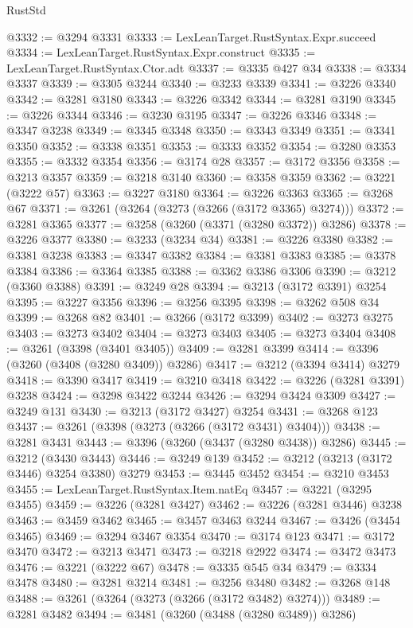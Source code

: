 \begin{lexlean}{RustStd}
\begin{coremodule}
@3332 := @3294 @3331
@3333 := LexLeanTarget.RustSyntax.Expr.succeed
@3334 := LexLeanTarget.RustSyntax.Expr.construct
@3335 := LexLeanTarget.RustSyntax.Ctor.adt
@3337 := @3335 @427 @34
@3338 := @3334 @3337
@3339 := @3305 @3244
@3340 := @3233 @3339
@3341 := @3226 @3340
@3342 := @3281 @3180
@3343 := @3226 @3342
@3344 := @3281 @3190
@3345 := @3226 @3344
@3346 := @3230 @3195
@3347 := @3226 @3346
@3348 := @3347 @3238
@3349 := @3345 @3348
@3350 := @3343 @3349
@3351 := @3341 @3350
@3352 := @3338 @3351
@3353 := @3333 @3352
@3354 := @3280 @3353
@3355 := @3332 @3354
@3356 := @3174 @28
@3357 := @3172 @3356
@3358 := @3213 @3357
@3359 := @3218 @3140
@3360 := @3358 @3359
@3362 := @3221 (@3222 @57)
@3363 := @3227 @3180
@3364 := @3226 @3363
@3365 := @3268 @67
@3371 := @3261 (@3264 (@3273 (@3266 (@3172 @3365) @3274)))
@3372 := @3281 @3365
@3377 := @3258 (@3260 (@3371 (@3280 @3372)) @3286)
@3378 := @3226 @3377
@3380 := @3233 (@3234 @34)
@3381 := @3226 @3380
@3382 := @3381 @3238
@3383 := @3347 @3382
@3384 := @3381 @3383
@3385 := @3378 @3384
@3386 := @3364 @3385
@3388 := @3362 @3386 @3306
@3390 := @3212 (@3360 @3388)
@3391 := @3249 @28
@3394 := @3213 (@3172 @3391) @3254
@3395 := @3227 @3356
@3396 := @3256 @3395
@3398 := @3262 @508 @34
@3399 := @3268 @82
@3401 := @3266 (@3172 @3399)
@3402 := @3273 @3275
@3403 := @3273 @3402
@3404 := @3273 @3403
@3405 := @3273 @3404
@3408 := @3261 (@3398 (@3401 @3405))
@3409 := @3281 @3399
@3414 := @3396 (@3260 (@3408 (@3280 @3409)) @3286)
@3417 := @3212 (@3394 @3414) @3279
@3418 := @3390 @3417
@3419 := @3210 @3418
@3422 := @3226 (@3281 @3391) @3238
@3424 := @3298 @3422 @3244
@3426 := @3294 @3424 @3309
@3427 := @3249 @131
@3430 := @3213 (@3172 @3427) @3254
@3431 := @3268 @123
@3437 := @3261 (@3398 (@3273 (@3266 (@3172 @3431) @3404)))
@3438 := @3281 @3431
@3443 := @3396 (@3260 (@3437 (@3280 @3438)) @3286)
@3445 := @3212 (@3430 @3443)
@3446 := @3249 @139
@3452 := @3212 (@3213 (@3172 @3446) @3254 @3380) @3279
@3453 := @3445 @3452
@3454 := @3210 @3453
@3455 := LexLeanTarget.RustSyntax.Item.natEq
@3457 := @3221 (@3295 @3455)
@3459 := @3226 (@3281 @3427)
@3462 := @3226 (@3281 @3446) @3238
@3463 := @3459 @3462
@3465 := @3457 @3463 @3244
@3467 := @3426 (@3454 @3465)
@3469 := @3294 @3467 @3354
@3470 := @3174 @123
@3471 := @3172 @3470
@3472 := @3213 @3471
@3473 := @3218 @2922
@3474 := @3472 @3473
@3476 := @3221 (@3222 @67)
@3478 := @3335 @545 @34
@3479 := @3334 @3478
@3480 := @3281 @3214
@3481 := @3256 @3480
@3482 := @3268 @148
@3488 := @3261 (@3264 (@3273 (@3266 (@3172 @3482) @3274)))
@3489 := @3281 @3482
@3494 := @3481 (@3260 (@3488 (@3280 @3489)) @3286)

\end{coremodule}
\end{lexlean}
